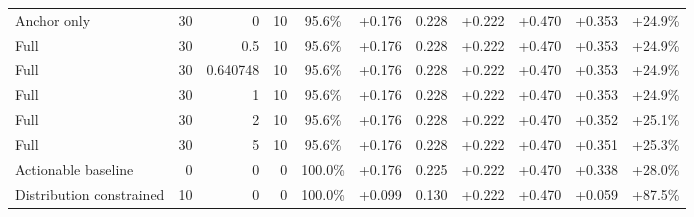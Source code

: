 \begin{table}[htbp]
\begin{tabular}{lrrrccccccc}
Anchor only & 30 & 0 & 10 & 95.6\% & +0.176 & 0.228 & +0.222 & +0.470 & +0.353 & +24.9\% \\
Full & 30 & 0.5 & 10 & 95.6\% & +0.176 & 0.228 & +0.222 & +0.470 & +0.353 & +24.9\% \\
Full & 30 & 0.640748 & 10 & 95.6\% & +0.176 & 0.228 & +0.222 & +0.470 & +0.353 & +24.9\% \\
Full & 30 & 1 & 10 & 95.6\% & +0.176 & 0.228 & +0.222 & +0.470 & +0.353 & +24.9\% \\
Full & 30 & 2 & 10 & 95.6\% & +0.176 & 0.228 & +0.222 & +0.470 & +0.352 & +25.1\% \\
Full & 30 & 5 & 10 & 95.6\% & +0.176 & 0.228 & +0.222 & +0.470 & +0.351 & +25.3\% \\
Actionable baseline & 0 & 0 & 0 & 100.0\% & +0.176 & 0.225 & +0.222 & +0.470 & +0.338 & +28.0\% \\
Distribution constrained & 10 & 0 & 0 & 100.0\% & +0.099 & 0.130 & +0.222 & +0.470 & +0.059 & +87.5\% \\
\bottomrule
\end{tabular}
\end{table}